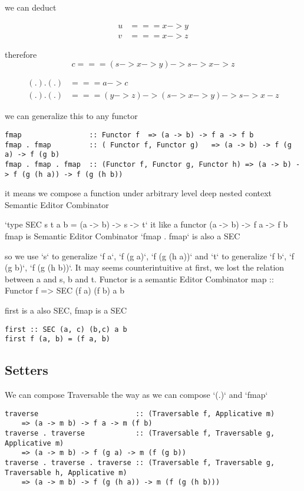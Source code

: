 \begin{WrapText}
we can deduct

\begin{align*}
u &=== x -> y  \\
v &=== x -> z
\end{align*}

therefore \begin{equation}c === (s -> x -> y) -> s -> x -> z\end{equation}

\begin{align*}
(.).(.) & === a -> c \\
(.).(.) & === (y -> z) -> (s -> x -> y) -> s -> x - z
\end{align*}
\end{WrapText}

we can generalize this to any functor

\begin{verbatim}
fmap                :: Functor f  => (a -> b) -> f a -> f b
fmap . fmap         :: ( Functor f, Functor g)   => (a -> b) -> f (g a) -> f (g b)
fmap . fmap . fmap  :: (Functor f, Functor g, Functor h) => (a -> b) -> f (g (h a)) -> f (g (h b))
\end{verbatim}

it means we compose a function under arbitrary level deep nested context
Semantic Editor Combinator

`type SEC s t a b = (a -> b) -> s -> t`
it like a functor (a -> b) -> f a -> f b
fmap is Semantic Editor Combinator
`fmap . fmap` is also a SEC

so we use `s` to generalize `f a`,  `f (g a)`, `f (g (h a))` and `t` to generalize `f b`,  `f (g b)`, `f (g (h b))`.
It may seems counterintuitive at first, we lost the relation between a and s, b and t.
Functor is a semantic Editor Combinator
map :: Functor f => SEC (f a) (f b) a b

first is a also SEC, fmap is a SEC

\begin{verbatim}
first :: SEC (a, c) (b,c) a b
first f (a, b) = (f a, b)
\end{verbatim}


\subsection{Setters}
We can compose Traversable the way as we can compose `(.)` and `fmap`

\begin{verbatim}
traverse                       :: (Traversable f, Applicative m)
    => (a -> m b) -> f a -> m (f b)
traverse . traverse            :: (Traversable f, Traversable g, Applicative m)
    => (a -> m b) -> f (g a) -> m (f (g b))
traverse . traverse . traverse :: (Traversable f, Traversable g, Traversable h, Applicative m)
    => (a -> m b) -> f (g (h a)) -> m (f (g (h b)))
\end{verbatim}

